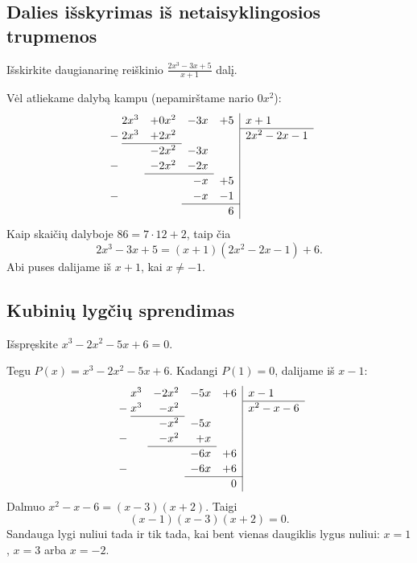 \documentclass[11pt,a4paper]{scrartcl}
\begin{document}
\subsection{Dalies išskyrimas iš netaisyklingosios trupmenos}
\begin{example}
Išskirkite daugianarinę reiškinio \(\displaystyle\frac{2x^3-3x+5}{x+1}\) dalį.
\end{example}
\begin{solution}
Vėl atliekame dalybą kampu (nepamirštame nario \(0x^2\)):
\[
\renewcommand{\arraystretch}{1.12}
\begin{array}{r@{\;}rrrr|l}
 &2x^3&+0x^2&-3x&+5&x+1\\\cline{6-6}
 -&2x^3&+2x^2&&&2x^2-2x-1\\\cline{2-3}
 &&-2x^2&-3x&&\\
 -&&-2x^2&-2x&&\\\cline{3-4}
 &&&-x&+5&\\
 -&&&-x&-1&\\\cline{4-5}
 &&&&6&
\end{array}
\]
Kaip skaičių dalyboje \(86=7\cdot12+2\), taip čia
\[2x^3-3x+5=(x+1)(2x^2-2x-1)+6.\]
Abi puses dalijame iš \(x+1\), kai \(x\ne-1\).
\end{solution}

\subsection{Kubinių lygčių sprendimas}
\begin{example}
Išspręskite \(x^3-2x^2-5x+6=0\).
\end{example}
\begin{solution}
Tegu \(P(x)=x^3-2x^2-5x+6\). Kadangi \(P(1)=0\), dalijame iš \(x-1\):
\[
\renewcommand{\arraystretch}{1.12}
\begin{array}{r@{\;}rrrr|l}
 &x^3&-2x^2&-5x&+6&x-1\\\cline{6-6}
 -&x^3&-x^2&&&x^2-x-6\\\cline{2-3}
 &&-x^2&-5x&&\\
 -&&-x^2&+x&&\\\cline{3-4}
 &&&-6x&+6&\\
 -&&&-6x&+6&\\\cline{4-5}
 &&&&0&
\end{array}
\]
Dalmuo \(x^2-x-6=(x-3)(x+2)\). Taigi
\[(x-1)(x-3)(x+2)=0.\]
Sandauga lygi nuliui tada ir tik tada, kai bent vienas daugiklis lygus nuliui: \(x=1\), \(x=3\) arba \(x=-2\).
\end{solution}
\end{document}
